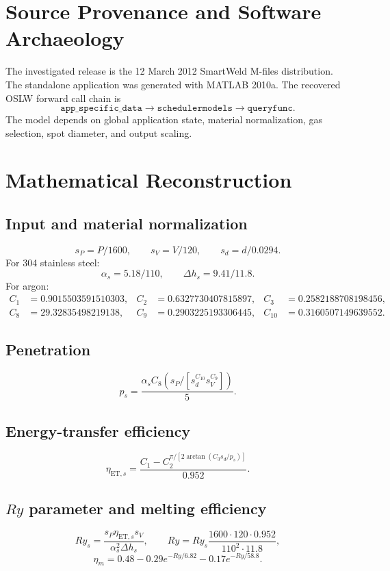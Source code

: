 \documentclass[11pt,a4paper]{article}
\begin{document}
\section{Source Provenance and Software Archaeology}
The investigated release is the 12 March 2012 SmartWeld M-files distribution.
The standalone application was generated with MATLAB 2010a. The recovered OSLW
forward call chain is
\begin{equation}
\boxed{\texttt{app\_specific\_data}\rightarrow
\texttt{schedulermodels}\rightarrow\texttt{queryfunc}}.
\end{equation}
The model depends on global application state, material normalization, gas
selection, spot diameter, and output scaling.
\section{Mathematical Reconstruction}
\subsection{Input and material normalization}
\begin{equation}
s_P=P/1600,\qquad s_V=V/120,\qquad s_d=d/0.0294.
\end{equation}
For 304 stainless steel:
\begin{equation}
\alpha_s=5.18/110,\qquad \Delta h_s=9.41/11.8.
\end{equation}
For argon:
\begin{align}
C_1&=0.9015503591510303,& C_2&=0.6327730407815897,& C_3&=0.2582188708198456,\\
C_8&=29.32835498219138,& C_9&=0.2903225193306445,& C_{10}&=0.3160507149639552.
\end{align}
\subsection{Penetration}
\begin{equation}
p_s=\frac{\alpha_sC_8(s_P/[s_d^{C_{10}}s_V^{C_9}])}{5}.
\end{equation}
\subsection{Energy-transfer efficiency}
\begin{equation}
\eta_{\mathrm{ET},s}=
\frac{C_1-C_2^{\pi/[2\arctan(C_3s_d/p_s)]}}{0.952}.
\end{equation}
\subsection{$Ry$ parameter and melting efficiency}
\begin{equation}
Ry_s=\frac{s_P\eta_{\mathrm{ET},s}s_V}{\alpha_s^2\Delta h_s},
\qquad
Ry=Ry_s\frac{1600\cdot120\cdot0.952}{110^2\cdot11.8},
\end{equation}
\begin{equation}
\eta_m=0.48-0.29e^{-Ry/6.82}-0.17e^{-Ry/58.8}.
\end{equation}
\end{document}
